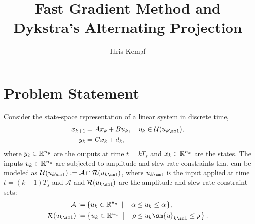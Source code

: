 \documentclass[hidelinks]{article}
\title{Fast Gradient Method and Dykstra's Alternating Projection}
\author{Idris Kempf}
\begin{document}
\maketitle
\section{Problem Statement}
Consider the state-space representation of a linear system in discrete time,
\begin{subequations}
\begin{align}\label{eq:statespace}
{x}_{k+1}&={A}{x}_{k}+{B}{u}_{k},\quad u_k\in\mathcal{U}({u}_{k\sm 1}),\\
{y}_{k}&={C}{x}_{k}+{d}_{k},
\end{align}
\end{subequations}
where ${y}_k \in \mathbb{R}^{n_y}$ are the outputs at time $t=k T_s$ and ${x}_k \in \mathbb{R}^{n_x}$ are the states. The inputs ${u}_k \in \mathbb{R}^{n_u}$ are subjected to amplitude and slew-rate constraints that can be modeled as $\mathcal{U}({u}_{k\sm 1})\eqdef\mathcal{A}\cap\mathcal{R}({u}_{k\sm 1})$, where ${u}_{k\sm 1}$ is the input applied at time $t=(k-1) T_s$ and $\mathcal{A}$ and $\mathcal{R}({u}_{k\sm 1})$ are the amplitude and slew-rate constraint sets:
\begin{subequations}\label{eq:constraints}
\begin{align}
\mathcal{A}&\eqdef\set{{u}_{k}\in\R^{n_u}}{-\alpha \leq {u}_{k} \leq \alpha},\\
\mathcal{R}({u}_{k\sm 1})&\eqdef\set{{u}_{k}\in\R^{n_u}}{-\rho \leq {u}_{k}\sm {u}_{k\sm 1} \leq \rho}.
\end{align}
\end{subequations}
\end{document}
